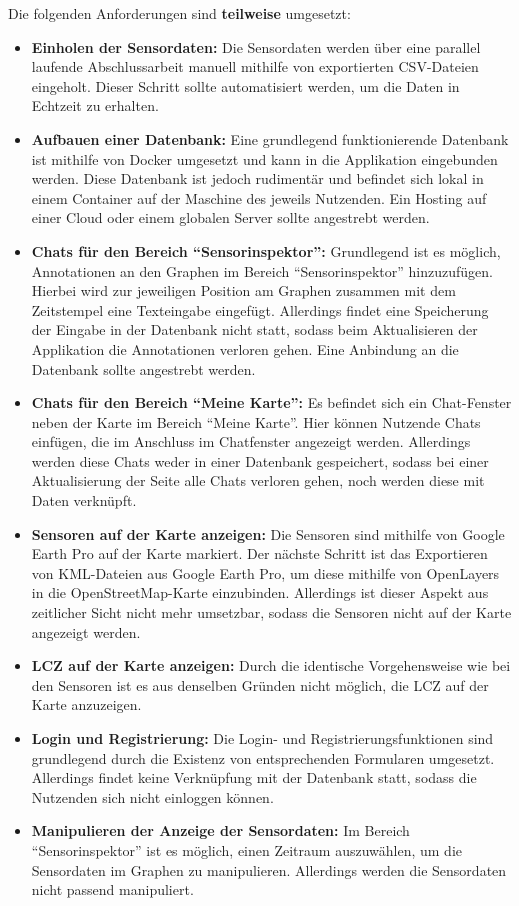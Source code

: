 Die folgenden Anforderungen sind \textbf{teilweise} umgesetzt:

\begin{itemize}
    \item \textbf{Einholen der Sensordaten:} Die Sensordaten werden über eine parallel laufende Abschlussarbeit manuell mithilfe von exportierten CSV-Dateien eingeholt. Dieser Schritt sollte automatisiert werden, um die Daten in Echtzeit zu erhalten.
    \item \textbf{Aufbauen einer Datenbank:} Eine grundlegend funktionierende Datenbank ist mithilfe von Docker umgesetzt und kann in die Applikation eingebunden werden. Diese Datenbank ist jedoch rudimentär und befindet sich lokal in einem Container auf der Maschine des jeweils Nutzenden. Ein Hosting auf einer Cloud oder einem globalen Server sollte angestrebt werden.
    \item \textbf{Chats für den Bereich \enquote{Sensorinspektor}:} Grundlegend ist es möglich, Annotationen an den Graphen im Bereich \enquote{Sensorinspektor} hinzuzufügen. Hierbei wird zur jeweiligen Position am Graphen zusammen mit dem Zeitstempel eine Texteingabe eingefügt. Allerdings findet eine Speicherung der Eingabe in der Datenbank nicht statt, sodass beim Aktualisieren der Applikation die Annotationen verloren gehen. Eine Anbindung an die Datenbank sollte angestrebt werden.
    \item \textbf{Chats für den Bereich \enquote{Meine Karte}:} Es befindet sich ein Chat-Fenster neben der Karte im Bereich \enquote{Meine Karte}. Hier können Nutzende Chats einfügen, die im Anschluss im Chatfenster angezeigt werden. Allerdings werden diese Chats weder in einer Datenbank gespeichert, sodass bei einer Aktualisierung der Seite alle Chats verloren gehen, noch werden diese mit Daten verknüpft.
    \item \textbf{Sensoren auf der Karte anzeigen:} Die Sensoren sind mithilfe von Google Earth Pro auf der Karte markiert. Der nächste Schritt ist das Exportieren von KML-Dateien aus Google Earth Pro, um diese mithilfe von OpenLayers in die OpenStreetMap-Karte einzubinden. Allerdings ist dieser Aspekt aus zeitlicher Sicht nicht mehr umsetzbar, sodass die Sensoren nicht auf der Karte angezeigt werden.
    \item \textbf{\ac{LCZ} auf der Karte anzeigen:} Durch die identische Vorgehensweise wie bei den Sensoren ist es aus denselben Gründen nicht möglich, die \ac{LCZ} auf der Karte anzuzeigen.
    \item \textbf{Login und Registrierung:} Die Login- und Registrierungsfunktionen sind grundlegend durch die Existenz von entsprechenden Formularen umgesetzt. Allerdings findet keine Verknüpfung mit der Datenbank statt, sodass die Nutzenden sich nicht einloggen können.
    \item \textbf{Manipulieren der Anzeige der Sensordaten:} Im Bereich \enquote{Sensorinspektor} ist es möglich, einen Zeitraum auszuwählen, um die Sensordaten im Graphen zu manipulieren. Allerdings werden die Sensordaten nicht passend manipuliert.
\end{itemize}

